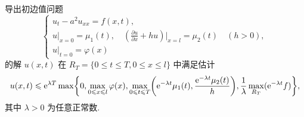 \begin{exercise}
  导出初边值问题
  \[\begin{cases}
    u_t - a^2 u_{xx} = f(x,t), \\
    u|_{x=0} = \mu_1(t),\quad
      \displaystyle\left(\frac{\partial u}{\partial x} + hu\right)\bigg|_{x=l} = \mu_2(t)\quad (h>0), \\
    u|_{t=0} = \varphi(x)
  \end{cases}\]
  的解 $u(x,t)$ 在 $R_T=\{0\leq t\leq T, 0\leq x\leq l\}$ 中满足估计
  \[u(x,t) \leqslant \mathrm{e}^{\lambda T} \max\biggl\{
    0, \max_{0\leqslant x\leqslant l} \varphi(x),
    \max_{0\leqslant t\leqslant T} \biggl(\mathrm{e}^{-\lambda t}\mu_1(t),
      \frac{\mathrm{e}^{-\lambda t}\mu_2(t)}{h}\biggr),
      \frac{1}{\lambda} \max_{R_T} (\mathrm{e}^{-\lambda t}f)
  \biggr\},\]
  其中 $\lambda>0$ 为任意正常数.
\end{exercise}

